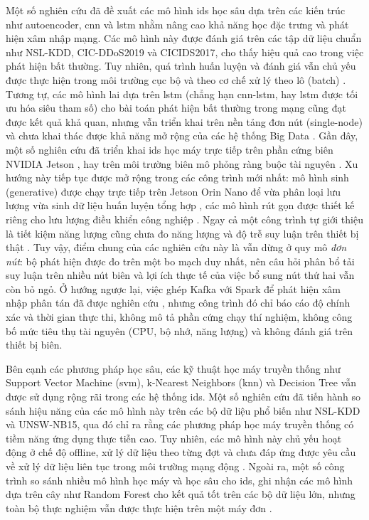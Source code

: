 Một số nghiên cứu đã đề xuất các mô hình \ac{ids} học sâu dựa trên các kiến trúc như autoencoder, \ac{cnn} và \ac{lstm} nhằm nâng cao khả năng học đặc trưng và phát hiện xâm nhập mạng. Các mô hình này được đánh giá trên các tập dữ liệu chuẩn như NSL-KDD, CIC-DDoS2019 và CICIDS2017, cho thấy hiệu quả cao trong việc phát hiện bất thường. Tuy nhiên, quá trình huấn luyện và đánh giá vẫn chủ yếu được thực hiện trong môi trường cục bộ và theo cơ chế xử lý theo lô (batch) \cite{singh2022,sun2020}. Tương tự, các mô hình lai dựa trên \ac{lstm} (chẳng hạn \ac{cnn}-\ac{lstm}, hay \ac{lstm} được tối ưu hóa siêu tham số) cho bài toán phát hiện bất thường trong mạng cũng đạt được kết quả khả quan, nhưng vẫn triển khai trên nền tảng đơn nút (single-node) và chưa khai thác được khả năng mở rộng của các hệ thống Big Data \cite{dash2025,bamber2024}. Gần đây, một số nghiên cứu đã triển khai \ac{ids} học máy trực tiếp trên phần cứng biên NVIDIA Jetson \cite{hasan2025iiot,baalaji2025ensemble}, hay trên môi trường biên mô phỏng ràng buộc tài nguyên \cite{asghar2026hedid}. Xu hướng này tiếp tục được mở rộng trong các công trình mới nhất: mô hình sinh (generative) được chạy trực tiếp trên Jetson Orin Nano để vừa phân loại lưu lượng vừa sinh dữ liệu huấn luyện tổng hợp \cite{diazgorrin2026jetson}, các mô hình rút gọn được thiết kế riêng cho lưu lượng điều khiển công nghiệp \cite{zhang2026edgeics}. Ngay cả một công trình tự giới thiệu là tiết kiệm năng lượng cũng chưa đo năng lượng và độ trễ suy luận trên thiết bị thật \cite{nassef2026tinyml}. Tuy vậy, điểm chung của các nghiên cứu này là vẫn dừng ở quy mô \emph{đơn nút}: bộ phát hiện được đo trên một bo mạch duy nhất, nên câu hỏi phân bổ tải suy luận trên nhiều nút biên và lợi ích thực tế của việc bổ sung nút thứ hai vẫn còn bỏ ngỏ. Ở hướng ngược lại, việc ghép Kafka với Spark để phát hiện xâm nhập phân tán đã được nghiên cứu \cite{kumar2025kafkaspark}, nhưng công trình đó chỉ báo cáo độ chính xác và thời gian thực thi, không mô tả phần cứng chạy thí nghiệm, không công bố mức tiêu thụ tài nguyên (CPU, bộ nhớ, năng lượng) và không đánh giá trên thiết bị biên.

Bên cạnh các phương pháp học sâu, các kỹ thuật học máy truyền thống như Support Vector Machine (\ac{svm}), k-Nearest Neighbors (\ac{knn}) và Decision Tree vẫn được sử dụng rộng rãi trong các hệ thống \ac{ids}. Một số nghiên cứu đã tiến hành so sánh hiệu năng của các mô hình này trên các bộ dữ liệu phổ biến như NSL-KDD và UNSW-NB15, qua đó chỉ ra rằng các phương pháp học máy truyền thống có tiềm năng ứng dụng thực tiễn cao. Tuy nhiên, các mô hình này chủ yếu hoạt động ở chế độ offline, xử lý dữ liệu theo từng đợt và chưa đáp ứng được yêu cầu về xử lý dữ liệu liên tục trong môi trường mạng động \cite{kilincer2021}. Ngoài ra, một số công trình so sánh nhiều mô hình học máy và học sâu cho \ac{ids}, ghi nhận các mô hình dựa trên cây như Random Forest cho kết quả tốt trên các bộ dữ liệu lớn, nhưng toàn bộ thực nghiệm vẫn được thực hiện trên một máy đơn \cite{allail2023}.

